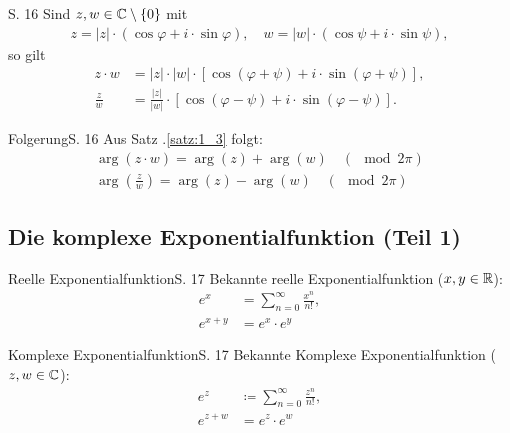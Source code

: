 \begin{satz}{S. 16}
\label{satz:1_3}
  Sind $z, w \in \mathbb{C}\setminus\{0\}$ mit
  \begin{align}
    z = |z| \cdot \left( \cos\varphi + i \cdot \sin\varphi \right), \quad w = |w| \cdot \left( \cos\psi + i \cdot \sin\psi \right),
  \end{align}
  so gilt
  \begin{align}
    z \cdot w &= |z| \cdot |w| \cdot \left[ \cos(\varphi + \psi) + i \cdot \sin(\varphi + \psi) \right],\\
    \frac{z}{w} &= \frac{|z|}{|w|} \cdot \left[ \cos(\varphi - \psi) + i \cdot \sin(\varphi - \psi) \right] .
  \end{align}
\end{satz}

\begin{bemerkung}{Folgerung}{S. 16}
  Aus Satz .\ref{satz:1_3} folgt:
  \begin{align}
    \operatorname{arg}(z \cdot w) = \operatorname{arg}(z) + \operatorname{arg}(w) \quad (\mod 2 \pi)\\
    \operatorname{arg}\left(\frac{z}{w}\right) = \operatorname{arg}(z) - \operatorname{arg}(w) \quad (\mod 2 \pi)
  \end{align}
\end{bemerkung}



\subsection{Die komplexe Exponentialfunktion (Teil 1)}

\begin{bemerkung}{Reelle Exponentialfunktion}{S. 17}
  Bekannte reelle Exponentialfunktion ($x, y \in \mathbb{R}$):
  \begin{align}
    e^x &= \sum_{n=0}^\infty \frac{x^n}{n!},\\
    e^{x+y} &= e^x \cdot e^y
  \end{align}
\end{bemerkung}

\begin{bemerkung}{Komplexe Exponentialfunktion}{S. 17}
  Bekannte Komplexe Exponentialfunktion ($z, w \in \mathbb{C}$):
  \begin{align}
    e^z &\coloneqq \sum_{n=0}^\infty \frac{z^n}{n!},\\
    e^{z+w} &= e^z \cdot e^w \label{eq:potenz_komplex}
  \end{align}
\end{bemerkung}

